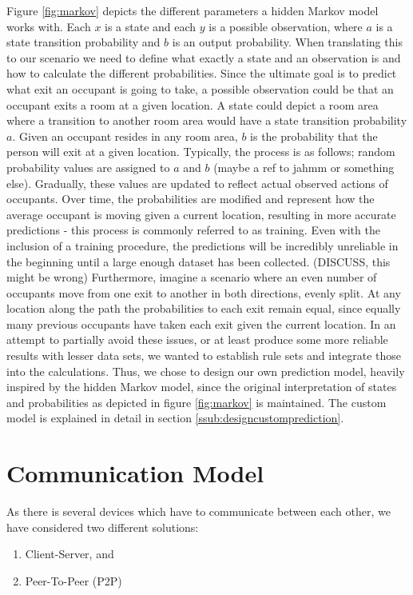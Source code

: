Figure \ref{fig:markov} depicts the different parameters a hidden Markov model works with. Each \(x\) is a state and each \(y\) is a possible observation, where \(a\) is a state transition probability and \(b\) is an output probability. When translating this to our scenario we need to define what exactly a state and an observation is and how to calculate the different probabilities. Since the ultimate goal is to predict what exit an occupant is going to take, a possible observation could be that an occupant exits a room at a given location. A state could depict a room area where a transition to another room area would have a state transition probability \(a\). Given an occupant resides in any room area, \(b\) is the probability that the person will exit at a given location. Typically, the process is as follows; random probability values are assigned to \(a\) and \(b\) (maybe a ref to jahmm or something else). Gradually, these values are updated to reflect actual observed actions of occupants. Over time, the probabilities are modified and represent how the average occupant is moving given a current location, resulting in more accurate predictions - this process is commonly referred to as training. Even with the inclusion of a training procedure, the predictions will be incredibly unreliable in the beginning until a large enough dataset has been collected. (DISCUSS, this might be wrong) Furthermore, imagine a scenario where an even number of occupants move from one exit to another in both directions, evenly split. At any location along the path the probabilities to each exit remain equal, since equally many previous occupants have taken each exit given the current location. In an attempt to partially avoid these issues, or at least produce some more reliable results with lesser data sets, we wanted to establish rule sets and integrate those into the calculations. Thus, we chose to design our own prediction model, heavily inspired by the hidden Markov model, since the original interpretation of states and probabilities as depicted in figure \ref{fig:markov} is maintained. The custom model is explained in detail in section \ref{ssub:designcustomprediction}. 

\section{Communication Model}
As there is several devices which have to communicate between each other, we have considered two different solutions:

\begin{enumerate}
\item Client-Server, and
\item Peer-To-Peer (P2P)
\end{enumerate}


